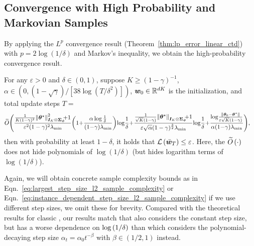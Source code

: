 \subsection{Convergence with High Probability and Markovian Samples}
By applying the $L^p$ convergence result (Theorem~\ref{thm:lp_error_linear_ctd}) with $p=2\log(1/\delta)$
and Markov's inequality, we obtain the high-probability convergence result.
\begin{theorem}\label{thm:whp_error_linear_ctd}
For any $\varepsilon>0$ and $\delta\in(0,1)$, suppose $K\geq (1{-}\gamma)^{-1}$, $\alpha\in(0,(1{-}\sqrt\gamma){/}[38\log(T{/}\delta^2)])$, ${\bm{w}}_0\in{\mathbb R}^{dK}$ is the initialization, and total update steps $T=$
    \begin{equation*}
    \begin{aligned}
        \wtilde{O}\Bigg(&\frac{\frac{1}{K(1{-}\gamma)^2}\!\norm{\btheta^{\star}}^2_{\bI_K{\otimes}\bSigma_{\bphi}}\!\!\!{+}1}{\varepsilon^2(1-\gamma)^2\lambda_{\min}}\!\prn{1{+}\frac{\alpha\log\frac{1}{\delta}}{(1{-}\gamma)\lambda_{\min}}}\!\log\!\frac{1}{\delta} {+}\frac{\frac{1}{\sqrt{K}(1{-}\gamma)}\!\norm{\btheta^{\star}}_{\bI_K{\otimes}\bSigma_{\bphi}}\!\!\!{+}1}{\varepsilon\sqrt{\alpha }(1-\gamma)^{\frac{3}{2}}\lambda_{\min}}\!\log\!\frac{1}{\delta}{+}\frac{\log\!\frac{\norm{\btheta_0{-}\btheta^{\star}}}{\varepsilon\sqrt{K}(1{-}\gamma)}}{\alpha (1{-}\gamma) \lambda_{\min}}\Bigg),   
    \end{aligned}
    \end{equation*}
then with probability at least $1-\delta$, it holds that ${\mathcal{L}}\left({\bar{{\bm{w}}}_T}\right)\leq\varepsilon$.
Here, the $\widetilde{O}\left({\cdot}\right)$ does not hide polynomials of $\log(1/\delta)$ (but hides logarithm terms of $\log(1/\delta)$).
\end{theorem}
Again, we will obtain concrete sample complexity bounds as in Eqn.~\eqref{eq:largest_step_size_l2_sample_complexity} or Eqn.~\eqref{eq:instance_dependent_step_size_l2_sample_complexity} if we use different step sizes, we omit these for brevity.
Compared with the theoretical results for classic {\LTD}, our results match \citep[Theorem~4][]{samsonov2024improved} that also considers the constant step size, but has a worse dependence on $\log\left({1/\delta}\right)$ than \citep[Theorem~3.1][]{wu2024statistical} which considers the polynomial-decaying step size $\alpha_t=\alpha_0 t^{-\beta}$ with $\beta\in(1/2, 1)$ instead.
